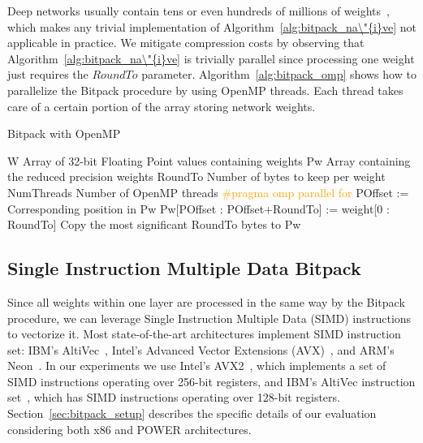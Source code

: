 Deep networks usually contain tens or even hundreds of millions of 
weights~\cite{alexnet, alexnet2, vgg}, which makes any trivial implementation 
of Algorithm~\ref{alg:bitpack_na\"{i}ve} not applicable in practice.
We mitigate compression costs by observing that Algorithm~\ref{alg:bitpack_na\"{i}ve} is trivially parallel since processing one weight just requires the $RoundTo$ parameter.
Algorithm~\ref{alg:bitpack_omp} shows how to parallelize the Bitpack procedure by using OpenMP threads.
Each thread takes care of a certain portion of the array storing network weights.

\begin{algorithm}%
\caption{Bitpack with OpenMP}
\label{alg:bitpack_omp}
{\fontsize{11}{11}\selectfont
\begin{algorithmic}[1]
    \State W 
    \Comment Array of 32-bit Floating Point values containing weights
    \State Pw
    \Comment Array containing the reduced precision weights
    \State RoundTo 
    \Comment Number of bytes to keep per weight 
    \State NumThreads
    \Comment Number of OpenMP threads
    \State \textcolor{orange} {\#pragma omp parallel for} %
            \State POffset := Corresponding position in Pw
            \State Pw[POffset : POffset+RoundTo] := weight[0 : RoundTo]
            \Comment Copy the most significant RoundTo bytes to Pw
      \EndFor
\end{algorithmic}
}
\end{algorithm}

\subsection{Single Instruction Multiple Data Bitpack}
Since all weights within one layer are processed in the same way by the Bitpack procedure, we can leverage Single Instruction Multiple Data (SIMD) instructions to vectorize it.
Most state-of-the-art architectures implement SIMD instruction set: IBM's 
AltiVec~\cite{Altivec}, Intel's Advanced Vector Extensions (AVX)~\cite{avx}, and ARM's Neon~\cite{neon}.
In our experiments we use
Intel's AVX2~\cite{avx}, which implements a set of SIMD 
instructions operating over 256-bit registers, and IBM's AltiVec instruction 
set~\cite{Altivec}, which has SIMD instructions operating over 128-bit registers.
Section~\ref{sec:bitpack_setup} describes the specific details of our evaluation considering both x86 and POWER architectures.

